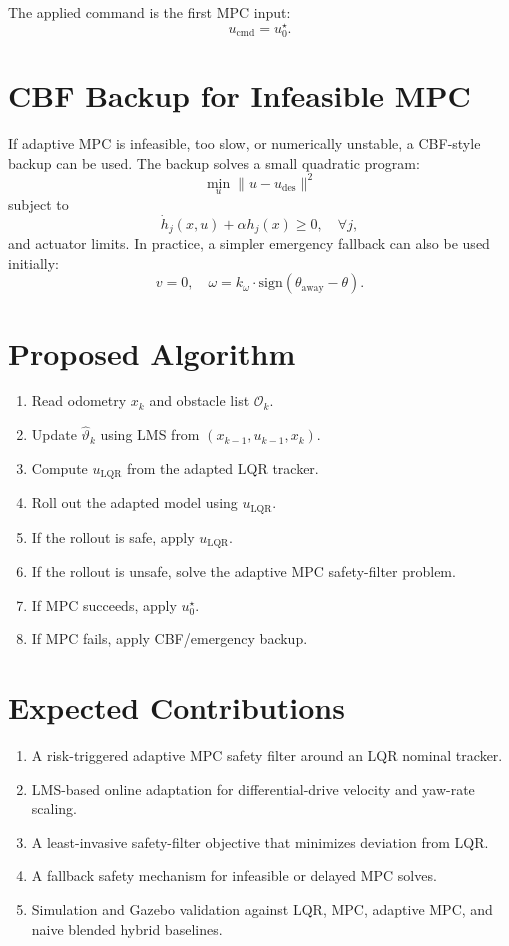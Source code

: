 \documentclass[11pt,a4paper]{article}
\begin{document}
The applied command is the first MPC input:
\[
u_{\mathrm{cmd}} = u_0^\star.
\]

\section{CBF Backup for Infeasible MPC}
If adaptive MPC is infeasible, too slow, or numerically unstable, a CBF-style backup can be used. The backup solves a small quadratic program:
\[
\min_u \|u-u_{\mathrm{des}}\|^2
\]
subject to
\[
\dot{h}_j(x,u) + \alpha h_j(x) \geq 0,\quad \forall j,
\]
and actuator limits. In practice, a simpler emergency fallback can also be used initially:
\[
v = 0,\quad \omega = k_\omega \cdot \mathrm{sign}(\theta_{\mathrm{away}}-\theta).
\]

\section{Proposed Algorithm}
\begin{enumerate}
    \item Read odometry $x_k$ and obstacle list $\mathcal{O}_k$.
    \item Update $\hat{\vartheta}_k$ using LMS from $(x_{k-1},u_{k-1},x_k)$.
    \item Compute $u_{\mathrm{LQR}}$ from the adapted LQR tracker.
    \item Roll out the adapted model using $u_{\mathrm{LQR}}$.
    \item If the rollout is safe, apply $u_{\mathrm{LQR}}$.
    \item If the rollout is unsafe, solve the adaptive MPC safety-filter problem.
    \item If MPC succeeds, apply $u_0^\star$.
    \item If MPC fails, apply CBF/emergency backup.
\end{enumerate}

\section{Expected Contributions}
\begin{enumerate}
    \item A risk-triggered adaptive MPC safety filter around an LQR nominal tracker.
    \item LMS-based online adaptation for differential-drive velocity and yaw-rate scaling.
    \item A least-invasive safety-filter objective that minimizes deviation from LQR.
    \item A fallback safety mechanism for infeasible or delayed MPC solves.
    \item Simulation and Gazebo validation against LQR, MPC, adaptive MPC, and naive blended hybrid baselines.
\end{enumerate}
\end{document}
